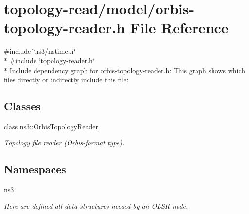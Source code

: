 \hypertarget{orbis-topology-reader_8h}{}\section{topology-\/read/model/orbis-\/topology-\/reader.h File Reference}
\label{orbis-topology-reader_8h}
{\ttfamily \#include \char`\"{}ns3/nstime.\+h\char`\"{}}\\*
{\ttfamily \#include \char`\"{}topology-\/reader.\+h\char`\"{}}\\*
Include dependency graph for orbis-\/topology-\/reader.h\+:
This graph shows which files directly or indirectly include this file\+:
\subsection*{Classes}
\begin{DoxyCompactItemize}
\item 
class \hyperlink{classns3_1_1OrbisTopologyReader}{ns3\+::\+Orbis\+Topology\+Reader}
\begin{DoxyCompactList}\small\item\em Topology file reader (Orbis-\/format type). \end{DoxyCompactList}\end{DoxyCompactItemize}
\subsection*{Namespaces}
\begin{DoxyCompactItemize}
\item 
 \hyperlink{namespacens3}{ns3}
\begin{DoxyCompactList}\small\item\em Here are defined all data structures needed by an O\+L\+SR node. \end{DoxyCompactList}\end{DoxyCompactItemize}
